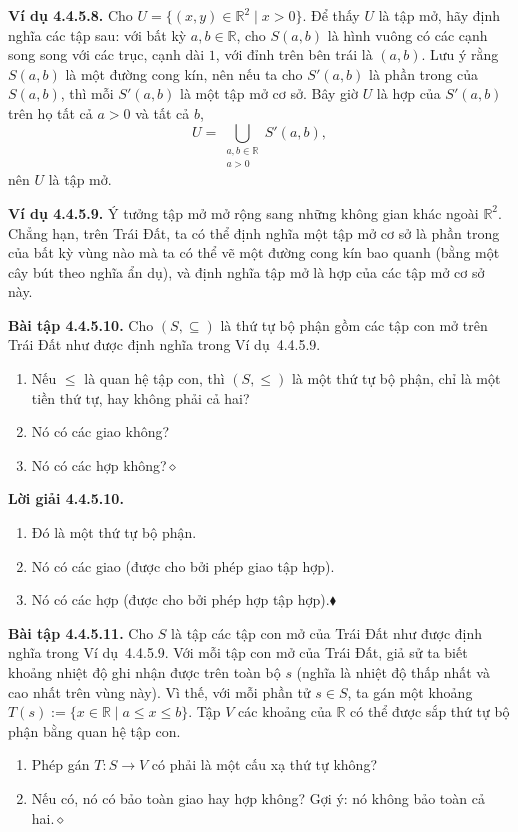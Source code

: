 \noindent\textbf{Ví dụ 4.4.5.8.}\keepwithnext
Cho $U=\{(x,y)\in\mathbb R^2\mid x>0\}$. Để thấy $U$ là tập mở, hãy định nghĩa các tập sau: với bất kỳ $a,b\in\mathbb R$, cho $S(a,b)$ là hình vuông có các cạnh song song với các trục, cạnh dài $1$, với đỉnh trên bên trái là $(a,b)$. Lưu ý rằng $S(a,b)$ là một đường cong kín, nên nếu ta cho $S'(a,b)$ là phần trong của $S(a,b)$, thì mỗi $S'(a,b)$ là một tập mở cơ sở. Bây giờ $U$ là hợp của $S'(a,b)$ trên họ tất cả $a>0$ và tất cả $b$,
\[
U=\bigcup_{\substack{a,b\in\mathbb R\\a>0}}S'(a,b),
\]
nên $U$ là tập mở.

\noindent\textbf{Ví dụ 4.4.5.9.}\keepwithnext
Ý tưởng tập mở mở rộng sang những không gian khác ngoài $\mathbb R^2$. Chẳng hạn, trên Trái Đất, ta có thể định nghĩa một tập mở cơ sở là phần trong của bất kỳ vùng nào mà ta có thể vẽ một đường cong kín bao quanh (bằng một cây bút theo nghĩa ẩn dụ), và định nghĩa tập mở là hợp của các tập mở cơ sở này.

\noindent\textbf{Bài tập 4.4.5.10.}\keepwithnext
Cho $(S,\subseteq)$ là thứ tự bộ phận gồm các tập con mở trên Trái Đất như được định nghĩa trong Ví dụ~4.4.5.9.
\begin{enumerate}[label=\alph*.]
\item Nếu $\le$ là quan hệ tập con, thì $(S,\le)$ là một thứ tự bộ phận, chỉ là một tiền thứ tự, hay không phải cả hai?
\item Nó có các giao không?
\item Nó có các hợp không?\nobreak\hfill$\diamond$
\end{enumerate}

\noindent\textbf{Lời giải 4.4.5.10.}\keepwithnext
\begin{enumerate}[label=\alph*.]
\item Đó là một thứ tự bộ phận.
\item Nó có các giao (được cho bởi phép giao tập hợp).
\item Nó có các hợp (được cho bởi phép hợp tập hợp).\nobreak\hfill$\blacklozenge$
\end{enumerate}

\noindent\textbf{Bài tập 4.4.5.11.}\keepwithnext
Cho $S$ là tập các tập con mở của Trái Đất như được định nghĩa trong Ví dụ~4.4.5.9. Với mỗi tập con mở của Trái Đất, giả sử ta biết khoảng nhiệt độ ghi nhận được trên toàn bộ $s$ (nghĩa là nhiệt độ thấp nhất và cao nhất trên vùng này). Vì thế, với mỗi phần tử $s\in S$, ta gán một khoảng $T(s):=\{x\in\mathbb R\mid a\le x\le b\}$. Tập $V$ các khoảng của $\mathbb R$ có thể được sắp thứ tự bộ phận bằng quan hệ tập con.
\begin{enumerate}[label=\alph*.]
\item Phép gán $T:S\to V$ có phải là một cấu xạ thứ tự không?
\item Nếu có, nó có bảo toàn giao hay hợp không? Gợi ý: nó không bảo toàn cả hai.\nobreak\hfill$\diamond$
\end{enumerate}

